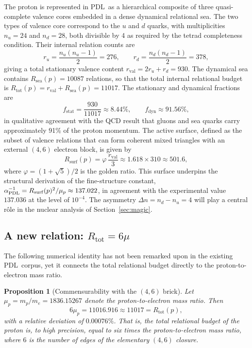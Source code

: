 \documentclass[11pt,a4paper]{article}
\newtheorem{proposition}[theorem]{Proposition}
\theoremstyle{definition}
\newcommand{\PDL}{\textnormal{PDL}}
\newcommand{\Rsurf}{R_{\mathrm{surf}}}
\newcommand{\Rsea}{R_{\mathrm{sea}}}
\newcommand{\Rtot}{R_{\mathrm{tot}}}
\newcommand{\rval}{r_{\mathrm{val}}}
\newcommand{\fstat}{f_{\mathrm{stat}}}
\newcommand{\fdyn}{f_{\mathrm{dyn}}}
\begin{document}
The proton is represented in \PDL\ as a hierarchical composite of three quasi-complete valence cores embedded in a dense dynamical relational sea. The two types of valence core correspond to the $u$ and $d$ quarks, with multiplicities $n_u = 24$ and $n_d = 28$, both divisible by 4 as required by the tetrad completeness condition. Their internal relation counts are
\[
r_u = \frac{n_u(n_u-1)}{2} = 276, \qquad r_d = \frac{n_d(n_d-1)}{2} = 378,
\]
giving a total stationary valence content $\rval = 2r_u + r_d = 930$. The dynamical sea contains $\Rsea(p) = 10087$ relations, so that the total internal relational budget is $\Rtot(p) = \rval + \Rsea(p) = 11017$. The stationary and dynamical fractions are
\[
\fstat = \frac{930}{11017} \approx 8.44\%, \qquad \fdyn \approx 91.56\%,
\]
in qualitative agreement with the QCD result that gluons and sea quarks carry approximately 91\% of the proton momentum.\cite{H1_ZEUS_2010} The active surface, defined as the subset of valence relations that can form coherent mixed triangles with an external $(4,6)$ electron block, is given by
\[
\Rsurf(p) = \varphi \, \frac{\rval}{3} \approx 1.618 \times 310 \approx 501.6,
\]
where $\varphi = (1+\sqrt{5})/2$ is the golden ratio.\cite{GoldenRatio_PDL_2026,Born_Golden_v2_2026} This surface underpins the structural derivation of the fine-structure constant, $\alpha_{\PDL}^{-1} = \Rsurf(p)^2/\mu_p \approx 137.022$, in agreement with the experimental value $137.036$ at the level of $10^{-4}$.\cite{Alpha_PDL_v2_2026} The asymmetry $\Delta n = n_d - n_u = 4$ will play a central r\^ole in the nuclear analysis of Section~\ref{sec:magic}.

\subsection{A new relation: \texorpdfstring{$\Rtot = 6\mu$}{Rtot = 6mu}}
\label{subsec:6mu}

The following numerical identity has not been remarked upon in the existing \PDL\ corpus, yet it connects the total relational budget directly to the proton-to-electron mass ratio.

\begin{proposition}[Commensurability with the $(4,6)$ brick]
\label{prop:6mu}
Let $\mu_p = m_p/m_e = 1836.15267$ denote the proton-to-electron mass ratio. Then
\[
6\mu_p = 11016.916 \approx 11017 = \Rtot(p),
\]
with a relative deviation of $0.00076\%$. That is, the total relational budget of the proton is, to high precision, equal to six times the proton-to-electron mass ratio, where $6$ is the number of edges of the elementary $(4,6)$ closure.
\end{proposition}
\end{document}
